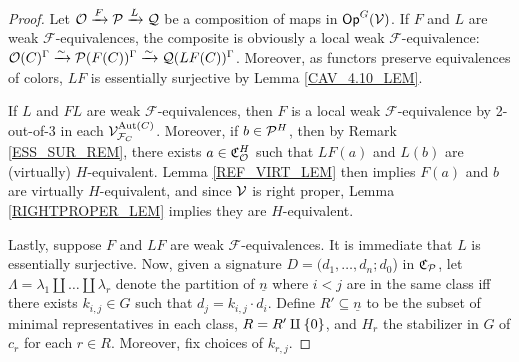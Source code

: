 \documentclass[a4paper,10pt
,draft
]{article}%
\renewcommand{\F}{\mathcal F}
\newcommand{\Q}{\mathcal Q}
\newcommand{\J}{\mathbb J}
\renewcommand{\1}{\eta}%
\begin{document}
\begin{proof}
      Let $\O \xrightarrow{F} \P \xrightarrow{L} \Q$ be a composition of maps in $\mathsf{Op}^G(\V)$.
      If $F$ and $L$ are weak $\F$-equivalences,
      the composite is obviously a local weak $\F$-equivalence:
      $\O(C)^\Gamma \xrightarrow{\sim} \P(F(C))^\Gamma \xrightarrow{\sim} \Q(LF(C))^\Gamma$.
      Moreover, as functors preserve equivalences of colors, $L F$ is essentially surjective by Lemma \ref{CAV_4.10_LEM}. 
      
      If $L$ and $FL$ are weak $\F$-equivalences,
      then $F$ is a local weak $\F$-equivalence by 2-out-of-3 in each $\V^{\Aut(C)}_{\F_C}$.
      Moreover, if $b \in \P^H$, then by Remark \ref{ESS_SUR_REM}, there exists $a \in \mathfrak C_\O^H$ such that
      $LF(a)$ and $L(b)$ are (virtually) $H$-equivalent.
      Lemma \ref{REF_VIRT_LEM} then implies $F(a)$ and $b$ are virtually $H$-equivalent, 
      and since $\V$ is right proper, Lemma \ref{RIGHTPROPER_LEM} implies they are $H$-equivalent.

      Lastly, suppose $F$ and $LF$ are weak $\F$-equivalences.
      It is immediate that $L$ is essentially surjective.
      Now, given a signature $D = (d_1,\ldots,d_n;d_0$) in $\C_\P$,
      let $\Lambda = \lambda_1 \amalg \dots \amalg \lambda_r$ denote the partition of $\underline{n}$
      where $i < j$ are in the same class iff there exists $k_{i,j} \in G$ such that $d_j = k_{i,j} \cdot d_i$.
      Define $R' \subseteq \underline{n}$ to be the subset of minimal representatives in each class,
      $R = R' \amalg \set{0}$,
      and $H_r$ the stabilizer in $G$ of $c_r$ for each $r \in R$.
      Moreover, fix choices of $k_{r,j}$. 
      

\end{proof}
\end{document}
